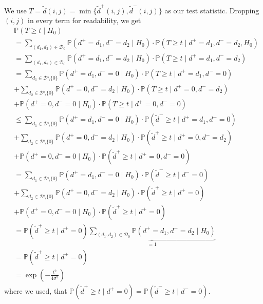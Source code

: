 \documentclass[a4paper,12pt]{article}
\theoremstyle{plain}
\theoremstyle{definition}
\theoremstyle{remark}
\begin{document}
We use $T = \tilde{d}(i, j) = \min \{ \tilde{d}^+(i, j), \tilde{d}^-(i, j) \}$ as our test statistic. Dropping $(i, j)$ in every term for readability, we get
\begin{align*}
	&\mathbb{P}(T \geq t \mid H_0) \\
	&= \sum_{(d_1, d_2) \in \mathcal{D}_0} \mathbb{P}(d^+ = d_1, d^- = d_2 \mid H_0) \cdot \mathbb{P}(T \geq t \mid d^+ = d_1, d^- = d_2, H_0) \\
	&= \sum_{(d_1, d_2) \in \mathcal{D}_0} \mathbb{P}(d^+ = d_1, d^- = d_2 \mid H_0) \cdot \mathbb{P}(T \geq t \mid d^+ = d_1, d^- = d_2) \\
	&= \sum_{d_1 \in \mathcal{D} \setminus \{ 0 \}} \mathbb{P}(d^+ = d_1, d^- = 0 \mid H_0) \cdot \mathbb{P}(T \geq t \mid d^+ = d_1, d^- = 0) \\
	&+ \sum_{d_2 \in \mathcal{D} \setminus \{ 0 \}} \mathbb{P}(d^+ = 0, d^- = d_2 \mid H_0) \cdot \mathbb{P}(T \geq t \mid d^+ = 0, d^- = d_2) \\
	&+ \mathbb{P}(d^+ = 0, d^- = 0 \mid H_0) \cdot \mathbb{P}(T \geq t \mid d^+ = 0, d^- = 0) \\
	&\leq \sum_{d_1 \in \mathcal{D} \setminus \{ 0 \}} \mathbb{P}(d^+ = d_1, d^- = 0 \mid H_0) \cdot \mathbb{P}(\tilde{d}^- \geq t \mid d^+ = d_1, d^- = 0) \\
	&+ \sum_{d_2 \in \mathcal{D} \setminus \{ 0 \}} \mathbb{P}(d^+ = 0, d^- = d_2 \mid H_0) \cdot \mathbb{P}(\tilde{d}^+ \geq t \mid d^+ = 0, d^- = d_2) \\
	&+ \mathbb{P}(d^+ = 0, d^- = 0 \mid H_0) \cdot \mathbb{P}(\tilde{d}^+ \geq t \mid d^+ = 0, d^- = 0) \\
	&= \sum_{d_1 \in \mathcal{D} \setminus \{ 0 \}} \mathbb{P}(d^+ = d_1, d^- = 0 \mid H_0) \cdot \mathbb{P}(\tilde{d}^- \geq t \mid d^- = 0) \\
	&+ \sum_{d_2 \in \mathcal{D} \setminus \{ 0 \}} \mathbb{P}(d^+ = 0, d^- = d_2 \mid H_0) \cdot \mathbb{P}(\tilde{d}^+ \geq t \mid d^+ = 0) \\
	&+ \mathbb{P}(d^+ = 0, d^- = 0 \mid H_0) \cdot \mathbb{P}(\tilde{d}^+ \geq t \mid d^+ = 0) \\
	&= \mathbb{P}(\tilde{d}^+ \geq t \mid d^+ = 0) \underbrace{\sum_{(d_1, d_2) \in \mathcal{D}_0} \mathbb{P}(d^+ = d_1, d^- = d_2 \mid H_0)}_{= 1} \\
	&= \mathbb{P}(\tilde{d}^+ \geq t \mid d^+ = 0) \\
	&= \exp \left( - \frac{t^2}{4 \sigma^2} \right)
\end{align*}
where we used, that $\mathbb{P}(\tilde{d}^+ \geq t \mid d^+ = 0) = \mathbb{P}(\tilde{d}^- \geq t \mid d^- = 0)$.
\end{document}
